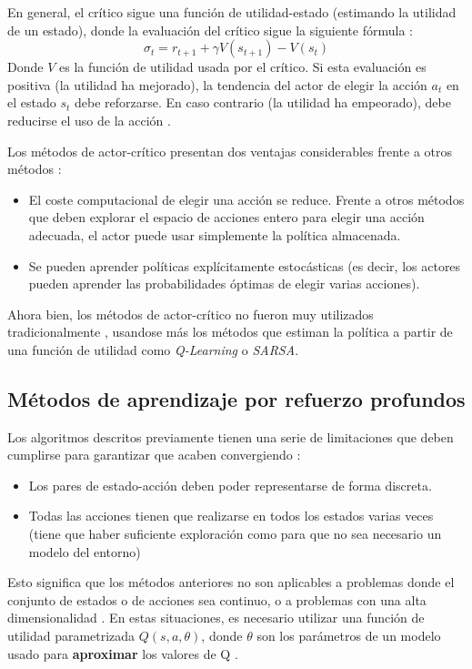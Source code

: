 En general, el crítico sigue una función de utilidad-estado (estimando la utilidad de un estado), donde la evaluación del crítico sigue la siguiente fórmula \cite{Sutton1998}:
\[\sigma_t = r_{t+1} + \gamma V(s_{t+1}) - V(s_t)\]
Donde $V$ es la función de utilidad usada por el crítico. Si esta evaluación es positiva (la utilidad ha mejorado), la tendencia del actor de elegir la acción $a_t$ en el estado $s_t$ debe reforzarse. En caso contrario (la utilidad ha empeorado), debe reducirse el uso de la acción \cite{Sutton1998}.

Los métodos de actor-crítico presentan dos ventajas considerables frente a otros métodos \cite{Sutton1998}:
\begin{itemize}
\item El coste computacional de elegir una acción se reduce. Frente a otros métodos que deben explorar el espacio de acciones entero para elegir una acción adecuada, el actor puede usar simplemente la política almacenada.
\item Se pueden aprender políticas explícitamente estocásticas (es decir, los actores pueden aprender las probabilidades óptimas de elegir varias acciones).
\end{itemize}

Ahora bien, los métodos de actor-crítico no fueron muy utilizados tradicionalmente \cite{Sutton1998}, usandose más los métodos que estiman la política a partir de una función de utilidad como \textit{Q-Learning} o \textit{SARSA}.

\subsection{Métodos de aprendizaje por refuerzo profundos}

Los algoritmos descritos previamente tienen una serie de limitaciones que deben cumplirse para garantizar que acaben convergiendo \cite{DBLP:journals/corr/abs-1811-12560}:
\begin{itemize}
	\item Los pares de estado-acción deben poder representarse de forma discreta.
	\item Todas las acciones tienen que realizarse en todos los estados varias veces (tiene que haber suficiente exploración como para que no sea necesario un modelo del entorno)
\end{itemize}

Esto significa que los métodos anteriores no son aplicables a problemas donde el conjunto de estados o de acciones sea continuo, o a problemas con una alta dimensionalidad \cite{DBLP:journals/corr/abs-1811-12560}. En estas situaciones, es necesario utilizar una función de utilidad parametrizada $Q(s,a,\theta)$, donde $\theta$ son los parámetros de un modelo usado para \textbf{aproximar} los valores de Q \cite{DBLP:journals/corr/abs-1811-12560}.

